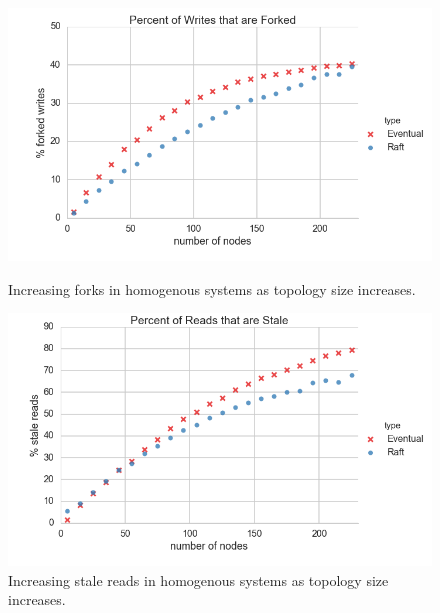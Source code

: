\documentclass{article}
\begin{document}
\begin{figure}
    \centering
      \includegraphics[width=\linewidth]{figures/scaling/forked_writes}
      \caption{Increasing forks in homogenous systems as topology size increases.}
      \label{fig:scaling_forked_writes}
    \endminipage\hfill
      \includegraphics[width=\linewidth]{figures/scaling/stale_reads}
      \caption{Increasing stale reads in homogenous systems as topology size increases.}
      \label{fig:scaling_stale_reads}
    \endminipage
\end{figure}
\end{document}
